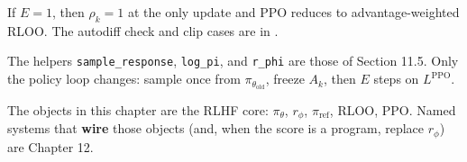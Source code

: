 If $E=1$, then $\rho_k=1$ at the only update and PPO reduces to advantage-weighted RLOO. The autodiff check and clip cases are in .

The helpers \texttt{sample\_response}, \texttt{log\_pi}, and \texttt{r\_phi} are those of Section 11.5. Only the policy loop changes: sample once from $\pi_{\theta_{\mathrm{old}}}$, freeze $A_k$, then $E$ steps on $L^{\mathrm{PPO}}$.




The objects in this chapter are the RLHF core: $\pi_\theta$, $r_\phi$, $\pi_{\mathrm{ref}}$, RLOO, PPO. Named systems that \textbf{wire} those objects (and, when the score is a program, replace $r_\phi$) are Chapter 12.

